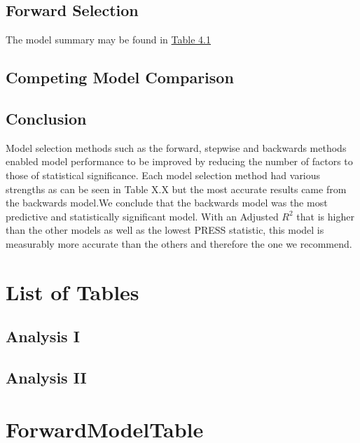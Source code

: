 \documentclass[american,]{article}
\begin{document}
\subsection{Forward Selection}\label{forward-selection}

The model summary may be found in
\hyperref[sec:FwdModelTable] {Table 4.1}

\subsubsection{}\label{section}

\subsection{Competing Model
Comparison}\label{competing-model-comparison}

\subsection{Conclusion}\label{conclusion}

Model selection methods such as the forward, stepwise and backwards
methods enabled model performance to be improved by reducing the number
of factors to those of statistical significance. Each model selection
method had various strengths as can be seen in Table X.X but the most
accurate results came from the backwards model.We conclude that the
backwards model was the most predictive and statistically significant
model. With an Adjusted \(R^2\) that is higher than the other models as
well as the lowest PRESS statistic, this model is measurably more
accurate than the others and therefore the one we recommend.

\section{List of Tables}\label{list-of-tables}

\subsection{Analysis I}\label{analysis-i}

\subsection{Analysis II}\label{analysis-ii}

\section{ForwardModelTable}
\label{sec:FwdModelTable}
\end{document}
